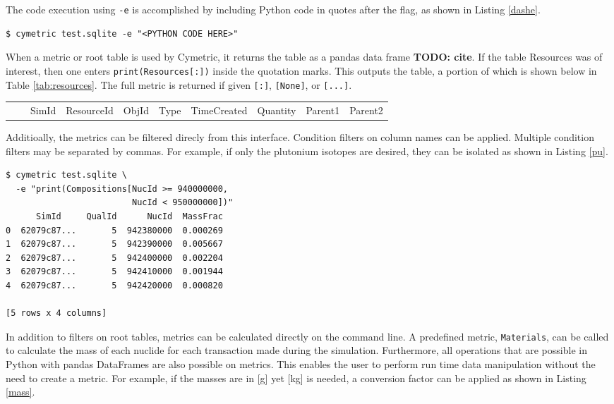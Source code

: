 \documentclass{anstrans}
\newcommand{\cyclus}{\textsc{Cyclus}\xspace}
\newcommand{\TODO}[1] {{\color{red}\textbf{TODO: #1}}}
\newcommand{\code}[1]{{\color{code}\texttt{#1}}}
\begin{document}
The code execution using \code{-e} is accomplished by including 
Python code in quotes after the flag, as shown in Listing \ref{dashe}. 

\begin{lstlisting}[caption ={Executing Code on a Database}, label=dashe]
$ cymetric test.sqlite -e "<PYTHON CODE HERE>"
\end{lstlisting}

When a metric or root table is used by Cymetric, it returns the table 
as a pandas data frame \TODO{cite}. If the table Resources was of interest, 
then one enters \code{print(Resources[:])} inside the quotation marks. 
This outputs the table, a portion of which is shown below in Table 
\ref{tab:resources}. The full metric is returned if given \code{[:]}, 
\code{[None]}, or \code{[...]}. 

\begin{table*}[htb]
  \centering
\begin{tabular}{llllllllll}
      &       & SimId      & ResourceId      &
      ObjId      & Type      & TimeCreated      & Quantity      &
      Parent1      & Parent2
\\
\end{tabular}
  \caption{The Resources table in the \cyclus database.}
  \label{tab:resources}
\end{table*}

Additioally, the metrics can be filtered direcly from this interface.
Condition filters on column names can be applied. Multiple condition
filters may be separated by commas. For example, if only the plutonium 
isotopes are desired, they can be isolated as shown in Listing \ref{pu}. 

\begin{lstlisting}[caption ={Filtering a Root Table in a Database}, label=pu]
$ cymetric test.sqlite \
  -e "print(Compositions[NucId >= 940000000, 
                         NucId < 950000000])"
      SimId     QualId      NucId  MassFrac
0  62079c87...       5  942380000  0.000269
1  62079c87...       5  942390000  0.005667
2  62079c87...       5  942400000  0.002204
3  62079c87...       5  942410000  0.001944
4  62079c87...       5  942420000  0.000820

[5 rows x 4 columns]
\end{lstlisting}

In addition to filters on root tables, metrics can  be calculated directly 
on the command line. A predefined metric, \code{Materials}, can be called 
to calculate the mass of each nuclide for each transaction made during 
the simulation. Furthermore, all operations that are possible in Python 
with pandas DataFrames are also possible on metrics.  This enables the user
to perform run time data manipulation without the need to create a metric.
For example, if the masses are in [g] yet [kg] is needed, 
a conversion factor can be applied as shown in Listing \ref{mass}.
\end{document}
